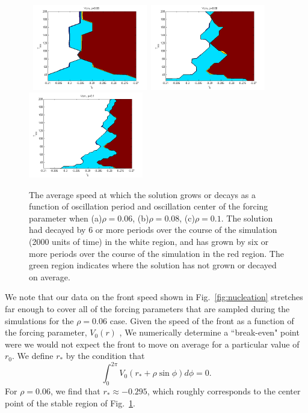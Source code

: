 \documentclass[pre,preprint,superscriptaddress]{revtex4-1}
\begin{document}
\begin{figure}[!htb]
\begin{center}
    \mbox{
\includegraphics[width=50mm]{Vcm006error.png}
\includegraphics[width=50mm]{Vcm008.png}
\includegraphics[width=50mm]{Vcm010.png}
}
\caption{The average speed at which the solution grows or decays as a function of oscillation period and oscillation center of the forcing parameter when (a)$\rho=0.06$, (b)$\rho=0.08$, (c)$\rho=0.1$.  The solution had decayed by 6 or more periods over the course of the simulation (2000 units of time) in the white region, and has grown by six or more periods over the course of the simulation  in the red region.  The green region indicates where the solution has not grown or decayed on average.}
    \label{fig:VcmCompare}
\end{center}
\end{figure}


We note that our data on the front speed shown in Fig.~\ref{fig:nucleation} stretches far enough to cover all of the forcing parameters that are sampled during the simulations for the $\rho=0.06$ case. Given the speed of the front as a function of the forcing parameter, $V_0(r)$ ,  We numerically determine a ``break-even" point were we would not expect the front to move on average for a particular value of $r_0$.  We define $r_*$  by the condition that 
\begin{equation}
\int_0^{2\pi} V_{0} ( r_*+\rho \sin\phi) d\phi = 0.
\end{equation}
For $\rho =0.06$, we find that $r_*\approx -0.295$, which roughly corresponds to the center point of the stable region of Fig.~\ref{fig:VcmCompare}.
\end{document}
